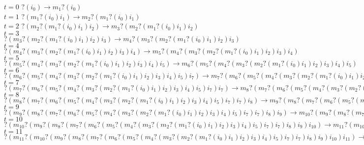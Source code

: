 \documentclass[12pt]{article}
\begin{document}
\noindent $t = 0$ $?(i_{0}) \rightarrow m_{1}?(i_{0})$\\
\noindent $t = 1$ $?(m_{1}?(i_{0})i_{1}) \rightarrow m_{2}?(m_{1}?(i_{0})i_{1})$\\
\noindent $t = 2$ $?(m_{2}?(m_{1}?(i_{0})i_{1})i_{2}) \rightarrow m_{3}?(m_{2}?(m_{1}?(i_{0})i_{1})i_{2})$\\
\noindent $t = 3$ $?(m_{3}?(m_{2}?(m_{1}?(i_{0})i_{1})i_{2})i_{3}) \rightarrow m_{4}?(m_{3}?(m_{2}?(m_{1}?(i_{0})i_{1})i_{2})i_{3})$\\
\noindent $t = 4$ $?(m_{4}?(m_{3}?(m_{2}?(m_{1}?(i_{0})i_{1})i_{2})i_{3})i_{4}) \rightarrow m_{5}?(m_{4}?(m_{3}?(m_{2}?(m_{1}?(i_{0})i_{1})i_{2})i_{3})i_{4}) $\\
\noindent $t = 5$ $?(m_{5}?(m_{4}?(m_{3}?(m_{2}?(m_{1}?(i_{0})i_{1})i_{2})i_{3})i_{4})i_{5}) \rightarrow m_{6}?(m_{5}?(m_{4}?(m_{3}?(m_{2}?(m_{1}?(i_{0})i_{1})i_{2})i_{3})i_{4})i_{5})$\\
\noindent $t = 6$ $?(m_{6}?(m_{5}?(m_{4}?(m_{3}?(m_{2}?(m_{1}?(i_{0})i_{1})i_{2})i_{3})i_{4})i_{5})i_{7}) \rightarrow m_{7}?(m_{6}?(m_{5}?(m_{4}?(m_{3}?(m_{2}?(m_{1}?(i_{0})i_{1})i_{2})i_{3})i_{4})i_{5})i_{7})$\\
\noindent $t = 7$ $?(m_{7}?(m_{6}?(m_{5}?(m_{4}?(m_{3}?(m_{2}?(m_{1}?(i_{0})i_{1})i_{2})i_{3})i_{4})i_{5})i_{7})i_{7}) \rightarrow m_{8}?(m_{7}?(m_{6}?(m_{5}?(m_{4}?(m_{3}?(m_{2}?(m_{1}?(i_{0})i_{1})i_{2})i_{3})i_{4})i_{5})i_{7})i_{7})$\\
\noindent $t = 8$ $?(m_{8}?(m_{7}?(m_{6}?(m_{5}?(m_{4}?(m_{3}?(m_{2}?(m_{1}?(i_{0})i_{1})i_{2})i_{3})i_{4})i_{5})i_{7})i_{7})i_{8}) \rightarrow m_{9}?(m_{8}?(m_{7}?(m_{6}?(m_{5}?(m_{4}?(m_{3}?(m_{2}?(m_{1}?(i_{0})i_{1})i_{2})i_{3})i_{4})i_{5})i_{7})i_{7})i_{8}) $\\
\noindent $t = 9$ $?(m_{9}?(m_{8}?(m_{7}?(m_{6}?(m_{5}?(m_{4}?(m_{3}?(m_{2}?(m_{1}?(i_{0})i_{1})i_{2})i_{3})i_{4})i_{5})i_{7})i_{7})i_{8})i_{9}) \rightarrow m_{10}?(m_{9}?(m_{8}?(m_{7}?(m_{6}?(m_{5}?(m_{4}?(m_{3}?(m_{2}?(m_{1}?(i_{0})i_{1})i_{2})i_{3})i_{4})i_{5})i_{7})i_{7})i_{8})i_{9})$\\
\noindent $t = 10$ $?(m_{10}?(m_{9}?(m_{8}?(m_{7}?(m_{6}?(m_{5}?(m_{4}?(m_{3}?(m_{2}?(m_{1}?(i_{0})i_{1})i_{2})i_{3})i_{4})i_{5})i_{7})i_{7})i_{8})i_{9})i_{10}) \rightarrow m_{11}?(m_{10}?(m_{9}?(m_{8}?(m_{7}?(m_{6}?(m_{5}?(m_{4}?(m_{3}?(m_{2}?(m_{1}?(i_{0})i_{1})i_{2})i_{3})i_{4})i_{5})i_{7})i_{7})i_{8})i_{9})i_{10})$\\
\noindent $t = 11$ $?(m_{11}?(m_{10}?(m_{9}?(m_{8}?(m_{7}?(m_{6}?(m_{5}?(m_{4}?(m_{3}?(m_{2}?(m_{1}?(i_{0})i_{1})i_{2})i_{3})i_{4})i_{5})i_{7})i_{7})i_{8})i_{9})i_{10})i_{11}) \rightarrow m_{12}?(m_{11}?(m_{10}?(m_{9}?(m_{8}?(m_{7}?(m_{6}?(m_{5}?(m_{4}?(m_{3}?(m_{2}?(m_{1}?(i_{0})i_{1})i_{2})i_{3})i_{4})i_{5})i_{7})i_{7})i_{8})i_{9})i_{10})i_{11})$\\
\end{document}
